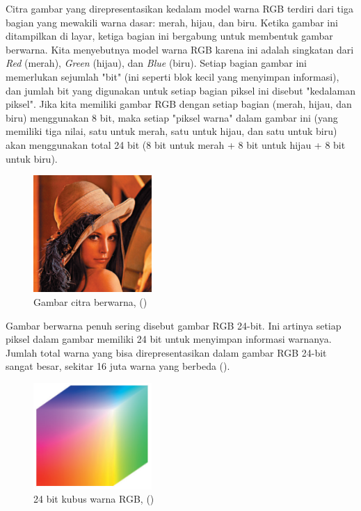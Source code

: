 Citra gambar yang direpresentasikan kedalam model warna RGB terdiri dari tiga bagian 
yang mewakili warna dasar: merah, hijau, dan biru. Ketika gambar ini ditampilkan di 
layar, ketiga bagian ini bergabung untuk membentuk gambar berwarna. Kita menyebutnya 
model warna RGB karena ini adalah singkatan dari \emph{Red} (merah), \emph{Green} 
(hijau), dan \emph{Blue} (biru). Setiap bagian gambar ini memerlukan sejumlah "bit" 
(ini seperti blok kecil yang menyimpan informasi), dan jumlah bit yang digunakan 
untuk setiap bagian piksel ini disebut "kedalaman piksel". Jika kita memiliki gambar 
RGB dengan setiap bagian (merah, hijau, dan biru) menggunakan 8 bit, maka setiap 
"piksel warna" dalam gambar ini (yang memiliki tiga nilai, satu untuk merah, satu 
untuk hijau, dan satu untuk biru) akan menggunakan total 24 bit (8 bit untuk merah + 
8 bit untuk hijau + 8 bit untuk biru).

\begin{figure}[H]
	\centering{}
	\includegraphics[width=0.4\textwidth]{gambar/gambar_citra_warna.png}
	\caption{Gambar citra berwarna, (\cite{Gonzalez:2018})}
\end{figure}

Gambar berwarna penuh sering disebut gambar RGB 24-bit. Ini artinya setiap piksel 
dalam gambar memiliki 24 bit untuk menyimpan informasi warnanya. Jumlah total warna 
yang bisa direpresentasikan dalam gambar RGB 24-bit sangat besar, sekitar 16 juta 
warna yang berbeda (\cite{Gonzalez:2018}).

\begin{figure}[H]
	\centering{}
	\includegraphics[width=0.4\textwidth]{gambar/rgb_cube.png}
	\caption{24 bit kubus warna RGB, (\cite{Gonzalez:2018})}
\end{figure}


